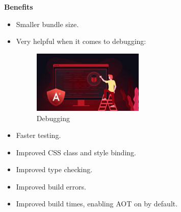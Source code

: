 \textbf{Benefits} 
\begin{itemize}
    \item Smaller bundle size.
    \item Very helpful when it comes to debugging:
    \begin{figure}[http]%
    \center%
    \includegraphics[width=0.5\textwidth]{images/ch2/Debugging.jpg}%
    \caption[Debugging]{Debugging}\label{fig: Debugging}%
  \end{figure}
    \item Faster testing.
    \item Improved CSS class and style binding.
    \item Improved type checking.
    \item Improved build errors.
    \item Improved build times, enabling AOT on by default.
\end{itemize}